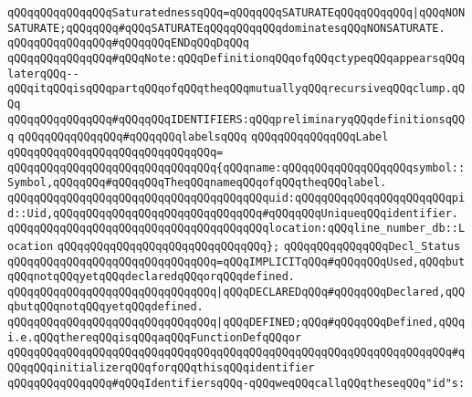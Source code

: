 \verb|qQQqqQQqqQQqqQQqSaturatednessqQQq=qQQqqQQqSATURATEqQQqqQQqqQQq|\verb#|qQQqNONSATURATE;qQQqqQQq#\verb|#qQQqSATURATEqQQqqQQqqQQqdominatesqQQqNONSATURATE.|\newline
\verb|qQQqqQQqqQQqqQQq#qQQqqQQqENDqQQqDqQQq|\newline
\newline
\verb|qQQqqQQqqQQqqQQq#qQQqNote:qQQqDefinitionqQQqofqQQqctypeqQQqappearsqQQqlaterqQQq--qQQqitqQQqisqQQqpartqQQqofqQQqtheqQQqmutuallyqQQqrecursiveqQQqclump.qQQq|\newline
\newline
\verb|qQQqqQQqqQQqqQQq#qQQqqQQqIDENTIFIERS:qQQqpreliminaryqQQqdefinitionsqQQq|\newline
\newline
\verb|qQQqqQQqqQQqqQQq#qQQqqQQqlabelsqQQq|\newline
\verb|qQQqqQQqqQQqqQQqLabel|\newline
\verb|qQQqqQQqqQQqqQQqqQQqqQQqqQQqqQQq=|\newline
\verb|qQQqqQQqqQQqqQQqqQQqqQQqqQQqqQQq{qQQqname:qQQqqQQqqQQqqQQqqQQqsymbol::Symbol,qQQqqQQq#qQQqqQQqTheqQQqnameqQQqofqQQqtheqQQqlabel.|\newline
\verb|qQQqqQQqqQQqqQQqqQQqqQQqqQQqqQQqqQQqqQQquid:qQQqqQQqqQQqqQQqqQQqqQQqpid::Uid,qQQqqQQqqQQqqQQqqQQqqQQqqQQqqQQq#qQQqqQQqUniqueqQQqidentifier.|\newline
\verb|qQQqqQQqqQQqqQQqqQQqqQQqqQQqqQQqqQQqqQQqlocation:qQQqline_number_db::Location|\newline
\verb|qQQqqQQqqQQqqQQqqQQqqQQqqQQqqQQq};|\newline
\newline
\verb|qQQqqQQqqQQqqQQqDecl_Status|\newline
\verb|qQQqqQQqqQQqqQQqqQQqqQQqqQQqqQQq=qQQqIMPLICITqQQq#qQQqqQQqUsed,qQQqbutqQQqnotqQQqyetqQQqdeclaredqQQqorqQQqdefined.|\newline
\verb|qQQqqQQqqQQqqQQqqQQqqQQqqQQqqQQq|\verb#|qQQqDECLAREDqQQq#\verb|#qQQqqQQqDeclared,qQQqbutqQQqnotqQQqyetqQQqdefined.|\newline
\verb|qQQqqQQqqQQqqQQqqQQqqQQqqQQqqQQq|\verb#|qQQqDEFINED;qQQq#\verb|#qQQqqQQqDefined,qQQqi.e.qQQqthereqQQqisqQQqaqQQqFunctionDefqQQqor|\newline
\verb|qQQqqQQqqQQqqQQqqQQqqQQqqQQqqQQqqQQqqQQqqQQqqQQqqQQqqQQqqQQqqQQqqQQq#qQQqqQQqinitializerqQQqforqQQqthisqQQqidentifier|\newline
\newline
\verb|qQQqqQQqqQQqqQQq#qQQqIdentifiersqQQq-qQQqweqQQqcallqQQqtheseqQQq"id"s:|\newline
